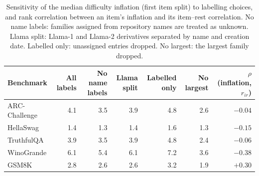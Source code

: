 \begin{table}[!htb]\centering\small
\caption{Sensitivity of the median difficulty inflation (first item split) to labelling choices, and rank correlation between an item's inflation and its item--rest correlation. No name labels: families assigned from repository names are treated as unknown. Llama split: Llama-1 and Llama-2 derivatives separated by name and creation date. Labelled only: unassigned entries dropped. No largest: the largest family dropped.}\label{tab:sensitivity}
\begin{tabular}{lrrrrrr}
\toprule
Benchmark & All labels & No name labels & Llama split & Labelled only & No largest & $\rho$(inflation, $r_{ir}$)\\
\midrule
ARC-Challenge & 4.1 & 3.5 & 3.9 & 4.8 & 2.6 & $-0.04$\\
HellaSwag & 1.4 & 1.3 & 1.4 & 1.6 & 1.3 & $-0.15$\\
TruthfulQA & 3.9 & 3.5 & 3.9 & 4.8 & 2.4 & $-0.06$\\
WinoGrande & 6.1 & 5.4 & 6.1 & 7.2 & 3.6 & $-0.38$\\
GSM8K & 2.8 & 2.6 & 2.6 & 3.2 & 1.9 & $+0.30$\\
\bottomrule
\end{tabular}
\end{table}
